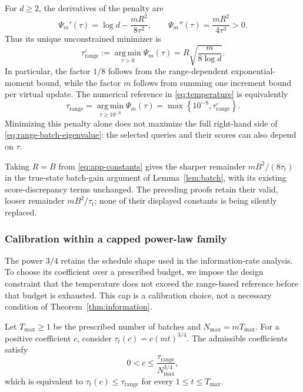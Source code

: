 \documentclass[10pt,twoside,letterpaper]{article}
\newcommand{\argmin}{\operatorname*{arg\,min}}
\begin{document}
For $d\ge2$, the derivatives of the penalty are
\begin{equation}
\Psi_m'(\tau)=\log d-\frac{mR^2}{8\tau^2},
\qquad
\Psi_m''(\tau)=\frac{mR^2}{4\tau^3}>0.
\end{equation}
Thus its unique unconstrained minimizer is
\begin{equation}
\tau_{\mathrm{range}}^{\circ}
:=\argmin_{\tau>0}\Psi_m(\tau)
=R\sqrt{\frac{m}{8\log d}}.
\label{eq:range-unfloored-minimizer}
\end{equation}
In particular, the factor $1/8$ follows from the range-dependent
exponential-moment bound, while the factor $m$ follows from summing
one increment bound per virtual update. The numerical reference
in \eqref{eq:temperature} is equivalently
\begin{equation}
\tau_{\mathrm{range}}
=\argmin_{\tau\ge10^{-8}}\Psi_m(\tau)
=\max\!\left\{10^{-8},\tau_{\mathrm{range}}^{\circ}\right\}.
\end{equation}
Minimizing this penalty alone does not maximize the full right-hand
side of \eqref{eq:range-batch-eigenvalue}: the selected queries and
their scores can also depend on $\tau$.

Taking $R=B$ from \eqref{eq:app-constants} gives the sharper
remainder $mB^2/(8\tau_t)$ in the true-state batch-gain argument of
Lemma~\ref{lem:batch}, with its existing score-discrepancy terms
unchanged. The preceding proofs retain their valid, looser remainder
$mB^2/\tau_t$; none of their displayed constants is being silently
replaced.

\subsubsection{Calibration within a capped power-law family}

The power $3/4$ retains the schedule shape used in the information-rate
analysis. To choose its coefficient over a prescribed budget, we impose
the design constraint that the temperature does not exceed the
range-based reference before that budget is exhausted. This cap is a
calibration choice, not a necessary condition of
Theorem~\ref{thm:information}.

Let $T_{\max}\ge1$ be the prescribed number of batches and
$N_{\max}=mT_{\max}$. For a positive coefficient $c$, consider
$\tau_t(c)=c(mt)^{3/4}$. The admissible coefficients satisfy
\begin{equation}
0<c\le\frac{\tau_{\mathrm{range}}}{N_{\max}^{3/4}},
\label{eq:range-coefficient-class}
\end{equation}
which is equivalent to $\tau_t(c)\le\tau_{\mathrm{range}}$
for every $1\le t\le T_{\max}$.
\end{document}
